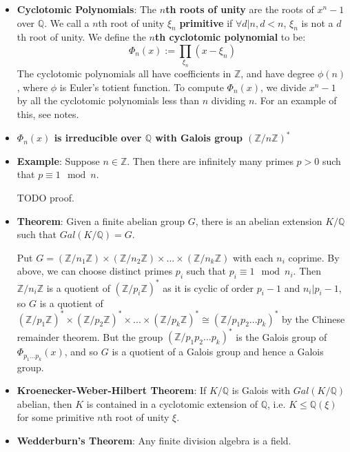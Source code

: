 \documentclass[11pt, oneside]{amsart}   	%
\theoremstyle{definition}
\begin{document}
\begin{itemize}
	\item \textbf{Cyclotomic Polynomials}: The \textbf{$n$th roots of unity} are the roots of $x^n - 1$ over $\mathbb Q$. We call a $n$th root of unity 
	$\xi_n$ \textbf{primitive} if $\forall d | n, d < n$, $\xi_n$ is not a $d$th root of unity. We define the \textbf{$n$th cyclotomic polynomial} to be:
	$$
		\Phi_n(x) := \prod_{\xi_n}(x - \xi_n)
	$$
	The cyclotomic polynomials all have coefficients in $\mathbb Z$, and have degree $\phi(n)$, where $\phi$ is Euler's totient function. To compute 
	$\Phi_n(x)$, we divide $x^n - 1$ by all the cyclotomic polynomials less than $n$ dividing $n$. For an example of this, see notes.
	
	\item \textbf{$\Phi_n(x)$ is irreducible over $\mathbb Q$ with Galois group $(\mathbb Z / n\mathbb Z)^*$}
	
	\item \textbf{Example}: Suppose $n\in\mathbb Z$. Then there are infinitely many primes $p > 0$ such that $p\equiv 1\mod n$.
	
	TODO proof.
	
	\item \textbf{Theorem}: Given a finite abelian group $G$, there is an abelian extension $K / \mathbb Q$ such that $Gal(K / \mathbb Q) = G$.
	
	Put $G = (\mathbb Z / n_1\mathbb Z)\times (\mathbb Z / n_2\mathbb Z)\times ... \times (\mathbb Z / n_k\mathbb Z)$ with each $n_i$ coprime. By 
	above, we can choose distinct primes $p_i$ such that $p_i\equiv 1\mod n_i$. Then $\mathbb Z / n_i\mathbb Z$ is a quotient of $(\mathbb Z / 
	p_i\mathbb Z)^*$ as it is cyclic of order $p_i - 1$ and $n_i | p_i - 1$, so $G$ is a quotient of $(\mathbb Z / p_1\mathbb Z)^*\times (\mathbb Z / 
	p_2\mathbb Z)^*\times ...\times (\mathbb Z / p_k\mathbb Z)^*\cong (\mathbb Z / p_1p_2...p_k)^*$ by the Chinese remainder theorem. But the group 
	$(\mathbb Z / p_1p_2...p_k)^*$ is the Galois group of $\Phi_{p_1...p_k}(x)$, and so $G$ is a quotient of a Galois group and hence a Galois group.
	
	\item \textbf{Kroenecker-Weber-Hilbert Theorem}: If $K / \mathbb Q$ is Galois with $Gal(K / \mathbb Q)$ abelian, then $K$ is contained in a cyclotomic 
	extension of $\mathbb Q$, i.e. $K\leq \mathbb Q(\xi)$ for some primitive $n$th root of unity $\xi$.
	
	\item \textbf{Wedderburn's Theorem}: Any finite division algebra is a field.
	

\end{itemize}
\end{document}

